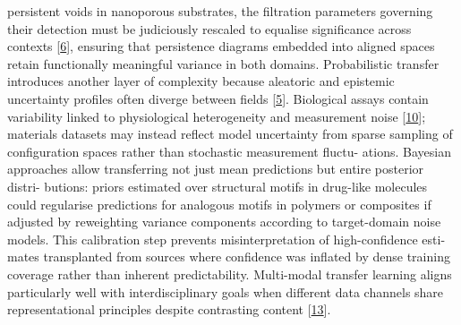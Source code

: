 \documentclass[
]{article}
\begin{document}
persistent voids in nanoporous substrates, the filtration parameters
governing their detection must be judiciously rescaled to equalise
significance across contexts {[}\protect\hyperlink{_bookmark46}{6}{]},
ensuring that persistence diagrams embedded into aligned spaces retain
functionally meaningful variance in both domains. Probabilistic transfer
introduces another layer of complexity because aleatoric and epistemic
uncertainty profiles often diverge between fields
{[}\protect\hyperlink{_bookmark45}{5}{]}. Biological assays contain
variability linked to physiological heterogeneity and measurement noise
{[}\protect\hyperlink{_bookmark50}{10}{]}; materials datasets may
instead reflect model uncertainty from sparse sampling of configuration
spaces rather than stochastic measurement fluctu- ations. Bayesian
approaches allow transferring not just mean predictions but entire
posterior distri- butions: priors estimated over structural motifs in
drug-like molecules could regularise predictions for analogous motifs in
polymers or composites if adjusted by reweighting variance components
according to target-domain noise models. This calibration step prevents
misinterpretation of high-confidence esti- mates transplanted from
sources where confidence was inflated by dense training coverage rather
than inherent predictability. Multi-modal transfer learning aligns
particularly well with interdisciplinary goals when different data
channels share representational principles despite contrasting content
{[}\protect\hyperlink{_bookmark53}{13}{]}.
\end{document}
